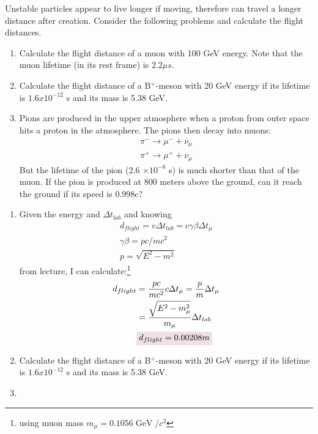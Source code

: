 \documentclass{article}
\DeclareMathOperator{\GeV}{GeV}
\begin{document}
\begin{problem}
    Unstable particles appear to live longer if moving, therefore can travel a longer distance after creation. Consider the following problems and calculate the flight distances. 
    \begin{enumerate}[label=\alph*.]
        \item Calculate the flight distance of a muon with 100 GeV energy. Note that the muon lifetime (in its rest frame) is $2.2 \mu s$. 
        \item Calculate the flight distance of a B$^{+}$-meson with 20 GeV energy if its lifetime is $1.6x10^{-12}$ s and its mass is 5.38 GeV. 
        \item Pions are produced in the upper atmosphere when a proton from outer space hits a proton in the atmosphere. The pions then decay into muons:
        \begin{gather*} 
            \pi^{-}\rightarrow \mu^{-}+\overline{\nu}_\mu
            \\
            \pi^{+}\rightarrow \mu^{+}+\nu_\mu
        \end{gather*}
        But the lifetime of the pion (2.6 $\times10^{-8}$ s) is much shorter than that of the muon. If the pion is produced at 800 meters above the ground, can it reach the ground if its speed is 0.998c?
    \end{enumerate}
    \answerline
    \begin{enumerate}[label=\alph*.]
        \item Given the energy and $\Delta t_{lab}$ and knowing 
        \begin{gather*}
            d_{flight}=v\Delta t_{lab}=\boxed{c\gamma\beta\Delta t_{\mu}}
            \\
            \gamma\beta=pc/mc^2
            \\
            p=\sqrt{E^2-m^2}
        \end{gather*} 
        from lecture, I can calculate:\footnote{using muon mass $m_\mu=0.1056\GeV/c^2$} 
        \begin{align*}
            d_{flight}&=\frac{pc}{mc^2}c\Delta t_{\mu}=\frac{p}{m}\Delta t_{\mu}
            \\
            &=\frac{\sqrt{E^2-m_{\mu}^2}}{m_{\mu}}\Delta t_{lab}
            \\
            &\coloredanswer{d_{flight}=0.00208m}
        \end{align*}
        \item Calculate the flight distance of a B$^{+}$-meson with 20 GeV energy if its lifetime is $1.6x10^{-12}$ s and its mass is 5.38 GeV. 
        \item 
    \end{enumerate}
\end{problem}
\end{document}
